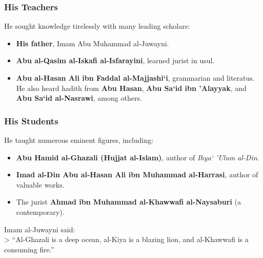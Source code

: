 \documentclass[
  a4paper,
  DIV=11,
  numbers=noendperiod]{scrartcl}
\providecommand{\tightlist}{%
  \setlength{\itemsep}{0pt}\setlength{\parskip}{0pt}}
\begin{document}
\subsubsection{His Teachers}\label{his-teachers}

He sought knowledge tirelessly with many leading scholars:

\begin{itemize}
\tightlist
\item
  \textbf{His father}, Imam Abu Muhammad al-Juwayni.\\
\item
  \textbf{Abu al-Qasim al-Iskafi al-Isfarayini}, learned jurist in
  usul.\\
\item
  \textbf{Abu al-Hasan Ali ibn Faddal al-Majjashi`i}, grammarian and
  literatus.\\
  He also heard hadith from \textbf{Abu Hasan}, \textbf{Abu Sa`id ibn
  'Alayyak}, and \textbf{Abu Sa`id al-Nasrawi}, among others.
\end{itemize}

\subsubsection{His Students}\label{his-students}

He taught numerous eminent figures, including:

\begin{itemize}
\tightlist
\item
  \textbf{Abu Hamid al-Ghazali (Hujjat al-Islam)}, author of \emph{Ihya`
  'Ulum al-Din}.\\
\item
  \textbf{Imad al-Din Abu al-Hasan Ali ibn Muhammad al-Harrasi}, author
  of valuable works.\\
\item
  The jurist \textbf{Ahmad ibn Muhammad al-Khawwafi al-Naysaburi} (a
  contemporary).
\end{itemize}

\begin{tcolorbox}[enhanced jigsaw, left=2mm, colframe=quarto-callout-tip-color-frame, bottomrule=.15mm, titlerule=0mm, toprule=.15mm, opacityback=0, breakable, toptitle=1mm, colbacktitle=quarto-callout-tip-color!10!white, rightrule=.15mm, title=\textcolor{quarto-callout-tip-color}{\faLightbulb}\hspace{0.5em}{Praise for His Students}, arc=.35mm, bottomtitle=1mm, leftrule=.75mm, opacitybacktitle=0.6, colback=white, coltitle=black]

Imam al-Juwayni said:\\
\textgreater{} ``Al-Ghazali is a deep ocean, al-Kiya is a blazing lion,
and al-Khawwafi is a consuming fire.''

\end{tcolorbox}
\end{document}
